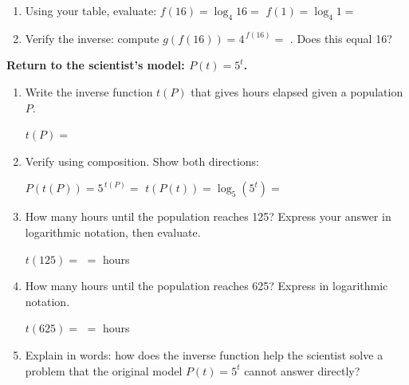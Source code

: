 \documentclass[10pt]{article}
\begin{document}
\begin{tcolorbox}[colback=white, colframe=black!40,
    title=\textbf{Tier R --- Remediate},
    fonttitle=\bfseries, arc=2mm, left=3mm, right=3mm, top=2mm, bottom=2mm]
\begin{enumerate}[leftmargin=1.8em, itemsep=10pt]
\item Using your table, evaluate: \quad $f(16) = \log_4 16 = $ \blank{2cm} \qquad $f(1) = \log_4 1 = $ \blank{2cm}

\vspace{6pt}

\item Verify the inverse: compute $g(f(16)) = 4^{\,f(16)} = $ \blank{2cm}. Does this equal 16? \blank{1.5cm}

\end{enumerate}
\end{tcolorbox}

\vspace{0.1in}

\begin{tcolorbox}[colback=white, colframe=black!40,
    title=\textbf{Tier A --- Approaching Proficiency},
    fonttitle=\bfseries, arc=2mm, left=3mm, right=3mm, top=2mm, bottom=2mm]

\textbf{Return to the scientist's model: $P(t) = 5^t$.}

\begin{enumerate}[leftmargin=1.8em, itemsep=10pt]

\item Write the inverse function $t(P)$ that gives hours elapsed given a population $P$.

\vspace{4pt}
$t(P) = $ \blank{4cm}

\item Verify using composition. Show both directions:

\vspace{4pt}
$P(t(P)) = 5^{\,t(P)} = $ \blank{4cm} \quad $t(P(t)) = \log_5(5^t) = $ \blank{4cm}

\item How many hours until the population reaches 125? Express your answer in logarithmic notation, then evaluate.

\vspace{4pt}
$t(125) = $ \blank{3cm} $= $ \blank{2cm} hours

\item How many hours until the population reaches 625? Express in logarithmic notation.

\vspace{4pt}
$t(625) = $ \blank{3cm} $= $ \blank{2cm} hours

\item Explain in words: how does the inverse function help the scientist solve a problem
      that the original model $P(t) = 5^t$ cannot answer directly?


\end{enumerate}
\end{tcolorbox}
\end{document}
